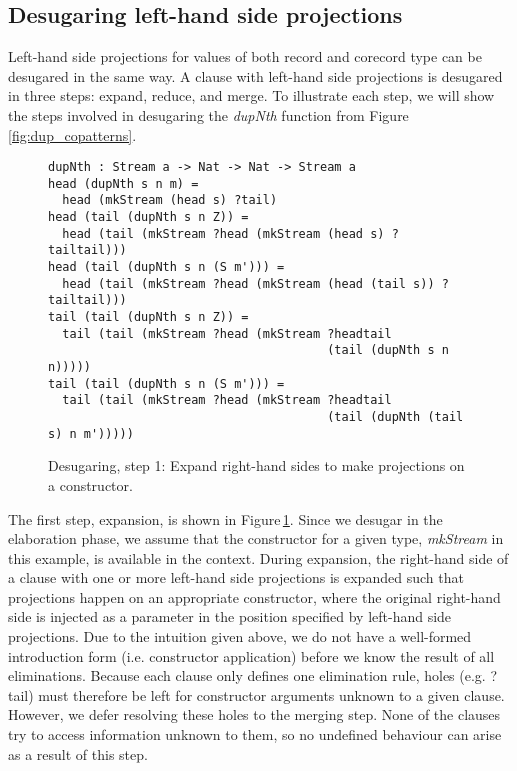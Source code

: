 \subsection{Desugaring left-hand side projections}
Left-hand side projections for values of both record and corecord type can be desugared in the same way. A clause with left-hand side projections is desugared in three steps: expand, reduce, and merge. To illustrate each step, we will show the steps involved in desugaring the \textit{dupNth} function from Figure\,\ref{fig:dup_copatterns}. 
\begin{figure}
\begin{lstlisting}[mathescape]
dupNth : Stream a -> Nat -> Nat -> Stream a
head (dupNth s n m) = 
  head (mkStream (head s) ?tail) 
head (tail (dupNth s n Z)) = 
  head (tail (mkStream ?head (mkStream (head s) ?tailtail)))
head (tail (dupNth s n (S m'))) = 
  head (tail (mkStream ?head (mkStream (head (tail s)) ?tailtail)))
tail (tail (dupNth s n Z)) = 
  tail (tail (mkStream ?head (mkStream ?headtail 
                                       (tail (dupNth s n n)))))
tail (tail (dupNth s n (S m'))) = 
  tail (tail (mkStream ?head (mkStream ?headtail 
                                       (tail (dupNth (tail s) n m')))))
\end{lstlisting}
\caption{Desugaring, step 1: Expand right-hand sides to make projections on a constructor.}
\label{fig:desugar_step1}
\end{figure}

The first step, expansion, is shown in Figure\,\ref{fig:desugar_step1}. Since we desugar in the elaboration phase, we assume that the constructor for a given type,  \textit{mkStream} in this example, is available in the context. During expansion, the right-hand side of a clause with one or more left-hand side projections is expanded such that projections happen on an appropriate constructor, where the original right-hand side is injected as a parameter in the position specified by left-hand side projections. Due to the intuition given above, we do not have a well-formed introduction form (i.e. constructor application) before we know the result of all eliminations. Because each clause only defines one elimination rule, holes (e.g. ?tail) must therefore be left for constructor arguments unknown to a given clause. However, we defer resolving these holes to the merging step. None of the clauses try to access information unknown to them, so no undefined behaviour can arise as a result of this step.

